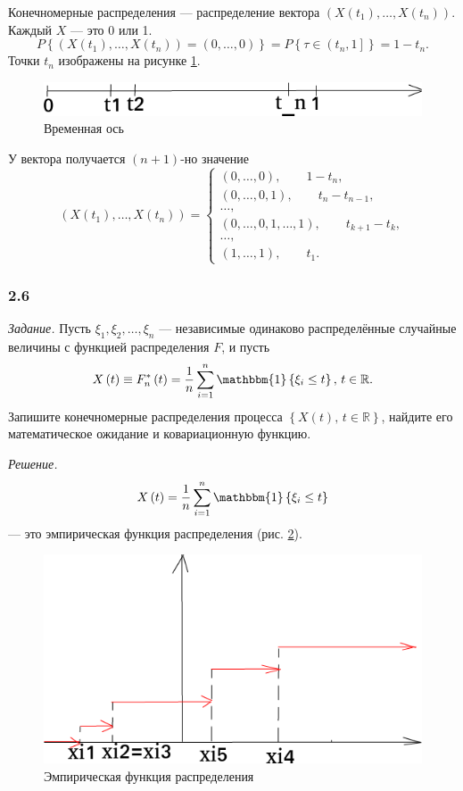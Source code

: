 Конечномерные распределения ---
распределение вектора $ \left( X \left( t_1 \right), \dotsc, X \left( t_n \right) \right) $.
Каждый $X$ --- это 0 или 1.
$$P \left\{
    \left( X \left( t_1 \right), \dotsc, X \left( t_n \right) \right) = \left( 0, \dotsc, 0 \right)
  \right\} =
  P \left\{ \tau \in \left( t_n , 1 \right] \right\} =
  1 - t_n.$$
Точки $t_n$ изображены на рисунке \ref{fig:251}.

\begin{figure}[h!]
 \centering
 \includegraphics[width=.5\textwidth]{./pictures/2_5_1.png}
 \caption{Временная ось}
 \label{fig:251}
\end{figure}

У вектора получается $ \left( n + 1 \right) $-но значение
$$ \left( X \left( t_1 \right), \dotsc, X \left( t_n \right) \right) =
  \begin{cases}
    \left( 0, \dotsc, 0 \right), \qquad 1 - t_n, \\
    \left( 0, \dotsc, 0, 1 \right), \qquad t_n - t_{n - 1}, \\
    \dotsc, \\
    \left( 0, \dotsc, 0, 1, \dotsc, 1 \right), \qquad t_{k + 1} - t_k, \\
    \dotsc, \\
    \left( 1, \dotsc, 1 \right), \qquad t_1.
  \end{cases}$$

\subsubsection*{2.6}

\textit{Задание.}
Пусть $ \xi_1, \xi_2, \dotsc, \xi_n$ ---
независимые одинаково распределённые случайные величины с функцией распределения $F$, и пусть
$$X \left( t \right) \equiv
  F_n^* \left( t \right) =
  \frac{1}{n} \sum \limits_{i = 1}^n \mathbbm{1} \left\{ \xi_i \leq t \right\}, \,
  t \in \mathbb{R}.$$
Запишите конечномерные распределения процесса
$ \left\{ X \left( t \right), \, t \in \mathbb{R} \right\} $,
найдите его математическое ожидание и ковариационную функцию.

\textit{Решение.}
$$X \left( t \right) =
  \frac{1}{n} \sum \limits_{i = 1}^n \mathbbm{1} \left\{ \xi_i \leq t \right\} $$
--- это эмпирическая функция распределения (рис. \ref{fig:26}).

\begin{figure}[h!]
 \centering
 \includegraphics[width=.5\textwidth]{./pictures/2_6.png}
 \caption{Эмпирическая функция распределения}
 \label{fig:26}
\end{figure}

